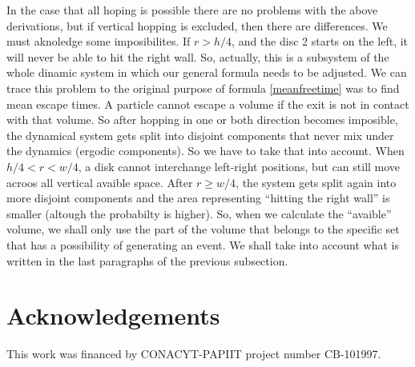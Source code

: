 \documentclass[letterpaper,10pt, jcp, aps]{revtex4-1}
\begin{document}
    In the case that all hoping is possible there are no problems with the above derivations,
    but if vertical hopping is excluded, then there are differences.
    We must aknoledge some imposibilites. If $r>h/4$, and the disc 2 starts
    on the left, it will never be able to hit the right wall. So, actually, this
    is a subsystem of the whole dinamic system in which our general formula needs
    to be adjusted. We can trace this problem to the original purpose of formula \ref{meanfreetime}
    was to find mean escape times. A particle cannot escape a volume if the exit is
    not in contact with that volume. So after hopping in one or both direction
    becomes imposible, the dynamical system gets split into disjoint components
    that never mix under the dynamics (ergodic components). So we have to take that
    into account. When $h/4<r<w/4$, a disk cannot interchange left-right positions,
    but can still move acroos all vertical avaible space.  After $r\geq w/4$,
    the system gets split again into more disjoint components and the
    area representing ``hitting the right wall'' is smaller (altough the probabilty is
    higher). So, when we calculate the ``avaible'' volume, we shall only use the
    part of the volume that belongs to the specific set that has a possibility of
    generating an event. We shall take into account what is written in the last
    paragraphs of the previous subsection.
    

    

    
\section{Acknowledgements}


This work was financed by CONACYT-PAPIIT project number CB-101997.






\end{document}
